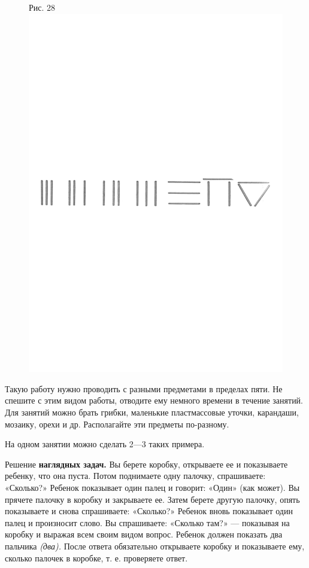 \documentclass[a5paper]{book}
\renewcommand{\emph}[1]{\textit{#1}}
\begin{document}
\begin{figure}
\centering
Рис. 28 \includegraphics[width=\linewidth]{media/media/image25.png}
\end{figure}

Такую работу нужно проводить с разными предметами в пределах пяти. Не
спешите с этим видом работы, отводите ему немного времени в течение
занятий. Для занятий можно брать грибки, маленькие пластмассовые уточки,
карандаши, мозаику, орехи и др. Располагайте эти предметы по-разному.

На одном занятии можно сделать 2---3 таких примера.

Решение \textbf{наглядных задач.} Вы берете коробку, открываете ее и
показываете ребенку, что она пуста. Потом поднимаете одну палочку,
спрашиваете: «Сколько?» Ребенок показывает один палец и говорит: «Один»
(как может). Вы прячете палочку в коробку и закрываете ее. Затем берете
другую палочку, опять показываете и снова спрашиваете: «Сколько?»
Ребенок вновь показывает один палец и произносит слово. Вы спрашиваете:
«Сколько там?» --- показывая на коробку и выражая всем своим видом
вопрос. Ребенок должен показать два пальчика \emph{(два).} После ответа
обязательно открываете коробку и показываете ему, сколько палочек в
коробке, т. е. проверяете ответ.
\end{document}
